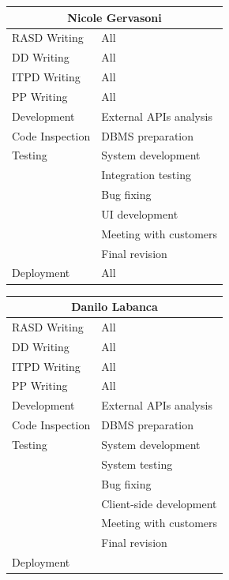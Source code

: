 \documentclass[english]{article}
\begin{document}
\begin{center}
	\begin{tabular}{|p{3cm}|p{4cm}|}
		\hline
		\multicolumn{2}{|c|}{\textbf{Nicole Gervasoni}}\\
		\hline
		RASD Writing & All\\
		\hline
		DD Writing & All\\
		\hline
		ITPD Writing & All\\
		\hline
		PP Writing & All\\
		\hline
		Development & External APIs analysis\\
		Code Inspection & DBMS preparation\\
		Testing & System development\\
		& Integration testing\\
		& Bug fixing\\
		& UI development\\
		& Meeting with customers\\
		& Final revision\\
		\hline
		Deployment & All\\
		\hline
	\end{tabular}
\end{center}

\begin{center}
	\begin{tabular}{|p{3cm}|p{4cm}|}
		\hline
		\multicolumn{2}{|c|}{\textbf{Danilo Labanca}}\\
		\hline
		RASD Writing & All \\ 
		\hline
		DD Writing & All \\ 
		\hline
		ITPD Writing & All \\ 
		\hline
		PP Writing & All \\ 
		\hline
		Development & External APIs analysis\\ 
		Code Inspection & DBMS preparation\\ 
		Testing & System development\\ 
		& System testing\\
		& Bug fixing\\ 
		& Client-side development\\ 
		& Meeting with customers\\ 
		& Final revision\\
		\hline
		Deployment & \\
		\hline
	\end{tabular}
\end{center}
\end{document}

